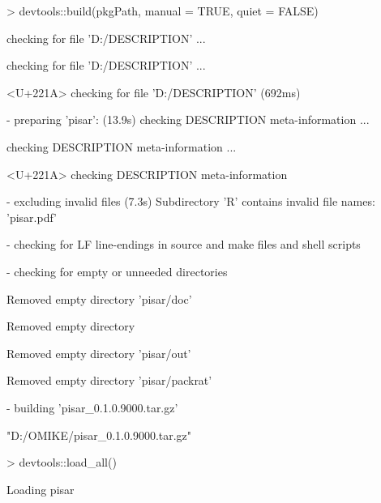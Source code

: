\documentclass[a4paper,12pt]{article}\usepackage[]{graphicx}\usepackage[]{color}
\begin{document}
\begin{Schunk}
\begin{Sinput}
> devtools::build(pkgPath, manual = TRUE, quiet = FALSE)
\end{Sinput}
\begin{Soutput}
  
  
  
   checking for file 'D:\OMIKE\pisar/DESCRIPTION' ...
  
   checking for file 'D:\OMIKE\pisar/DESCRIPTION' ... 
  
<U+221A>  checking for file 'D:\OMIKE\pisar/DESCRIPTION' (692ms)

  
  
  
-  preparing 'pisar': (13.9s)
   checking DESCRIPTION meta-information ...
  
   checking DESCRIPTION meta-information ... 
  
<U+221A>  checking DESCRIPTION meta-information

  
  
  
-  excluding invalid files (7.3s)
   Subdirectory 'R' contains invalid file names:
     'pisar.pdf'

  
  
  
-  checking for LF line-endings in source and make files and shell scripts

  
  
  
-  checking for empty or unneeded directories

  
   Removed empty directory 'pisar/doc'

  
Removed empty directory 
  
   Removed empty directory 'pisar/out'

  
   Removed empty directory 'pisar/packrat'

  
  
  
-  building 'pisar_0.1.0.9000.tar.gz'

  
   


\end{Soutput}
\begin{Soutput}
[1] "D:/OMIKE/pisar_0.1.0.9000.tar.gz"
\end{Soutput}
\begin{Sinput}
> devtools::load_all()
\end{Sinput}
\begin{Soutput}
Loading pisar
\end{Soutput}
\end{Schunk}
\end{document}
